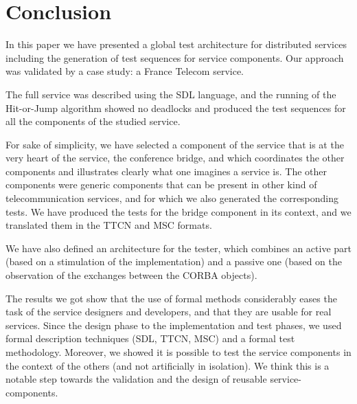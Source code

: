 
\section{Conclusion\label{conclusion}}

In this paper we have presented a global test architecture for  
distributed services including the generation of test sequences for
service components. Our approach was validated by a case study: a
France Telecom \audio service.

The full service was described using the SDL language, and the running
of the Hit-or-Jump algorithm showed no deadlocks and produced the test
sequences for all the components of the studied service.

For sake of simplicity, we have selected a component of the \audio service
that is at the very heart of the service, the conference bridge, and
which coordinates the other components and illustrates clearly what
one imagines a \audio service is. The other components were generic
components that can be present in other kind of telecommunication
services, and for which we also generated the corresponding tests. We
have produced the tests for the bridge component in its context, and
we translated them in the TTCN and MSC formats.

We have also defined an architecture for the tester, which combines an
active part (based on a stimulation of the implementation) and a
passive one (based on the observation of the exchanges between the
CORBA objects). 

The results we got show that the use of formal methods considerably
eases the task of the service designers and developers, and that they
are usable for real services. Since the design phase to the
implementation and test phases, we used formal description techniques
(SDL, TTCN, MSC) and a formal test methodology. Moreover, we showed it
is possible to test the service components in the context of the
others (and not artificially in isolation). We think this is a notable
step towards the validation and the design of reusable
service-components.

